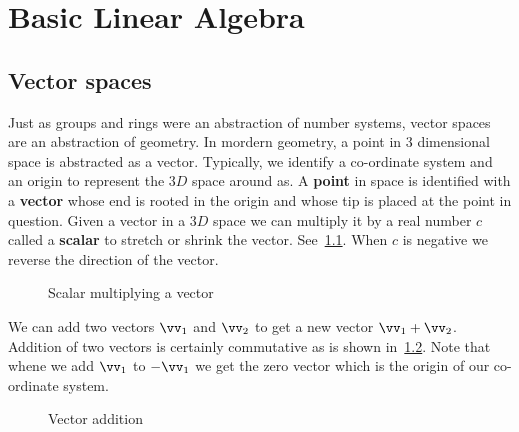 \chapter{Basic Linear Algebra}

\section{Vector spaces}
Just as groups and rings were an abstraction of number systems, vector spaces are an abstraction of geometry.
In mordern geometry, a point in $3$ dimensional space is abstracted as a vector. Typically, we identify a
co-ordinate system and an origin to represent the $3D$ space around as. A \textbf{point} in space is
identified with a \textbf{vector} whose end is rooted in the origin and whose tip is placed at the point in
question. 
Given a vector in a $3D$ space we can multiply it by a real number $c$ called a \textbf{scalar} to stretch or
shrink the vector. See~\ref{fig:tikz:vector_scalar_mult}. 
When $c$ is negative we reverse the direction of the vector. 
\begin{figure}
  
  \caption{Scalar multiplying a vector}\label{fig:tikz:vector_scalar_mult}
\end{figure}
We can add two vectors
$\vv_{1}$ and $\vv_{2}$ to get a new vector $\vv_{1} + \vv_{2}$. Addition of two vectors is certainly
commutative as is shown in~\ref{fig:tikz:vector_add}. Note that whene we add $\vv_{1}$ to $-\vv_{1}$ we get
the zero vector which is the origin of our co-ordinate system. 

\begin{figure}
  
  \caption{Vector addition}\label{fig:tikz:vector_add}
\end{figure}

